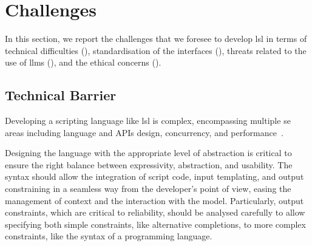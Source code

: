 \documentclass[manuscript,screen]{acmart}
\begin{document}
\section{Challenges}
\label{sec:challenges}

In this section, we report the challenges that we foresee to develop \ac{lsl} in terms of technical difficulties (), standardisation of the interfaces (), threats related to the use of \acp{llm} (), and the ethical concerns ().

\subsection{Technical Barrier}
\label{sec:technicalaspects}


Developing a scripting language like \ac{lsl} is complex, encompassing multiple \ac{se} areas including language and APIs design, concurrency, and performance~\cite{nystrom2021crafting}.

Designing the language with the appropriate level of abstraction is critical to ensure the right balance between expressivity, abstraction, and usability.
The syntax should allow the integration of script code, input templating, and output constraining in a seamless way from the developer's point of view, easing the management of context and the interaction with the model.
Particularly, output constraints, which are critical to reliability, should be analysed carefully to allow specifying both simple constraints, like alternative completions, to more complex constraints, like the syntax of a programming language.
\end{document}
